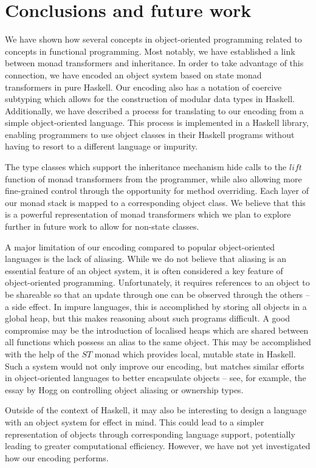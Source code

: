 \section{Conclusions and future work}
\label{sec:conclusions}

We have shown how several concepts in object-oriented programming related to concepts in functional programming. Most notably, we have established a link between monad transformers and inheritance. In order to take advantage of this connection, we have encoded an object system based on state monad transformers in pure Haskell. Our encoding also has a notation of coercive subtyping which allows for the construction of modular data types in Haskell. Additionally, we have described a process for translating to our encoding from a simple object-oriented language. This process is implemented in a Haskell library, enabling programmers to use object classes in their Haskell programs without having to resort to a different language or impurity. 

The type classes which support the inheritance mechanism hide calls to the $\mathit{lift}$ function of monad transformers from the programmer, while also allowing more fine-grained control through the opportunity for method overriding. Each layer of our monad stack is mapped to a corresponding object class. We believe that this is a powerful representation of monad transformers which we plan to explore further in future work to allow for non-state classes.

A major limitation of our encoding compared to popular object-oriented languages is the lack of aliasing. While we do not believe that aliasing is an essential feature of an object system, it is often considered a key feature of object-oriented programming. Unfortunately, it requires references to an object to be shareable so that an update through one can be observed through the others -- a side effect. In impure languages, this is accomplished by storing all objects in a global heap, but this makes reasoning about such programs difficult. A good compromise may be the introduction of localised heaps which are shared between all functions which possess an alias to the same object. This may be accomplished with the help of the $\mathit{ST}$ monad \cite{launchbury1995state} which provides local, mutable state in Haskell. Such a system would not only improve our encoding, but matches similar efforts in object-oriented languages to better encapsulate objects -- see, for example, the essay by Hogg\cite{hogg1992geneva} on controlling object aliasing or ownership types\cite{clarke1998ownership}.

Outside of the context of Haskell, it may also be interesting to design a language with an object system for effect in mind. This could lead to a simpler representation of objects through corresponding language support, potentially leading to greater computational efficiency. However, we have not yet investigated how our encoding performs. 


